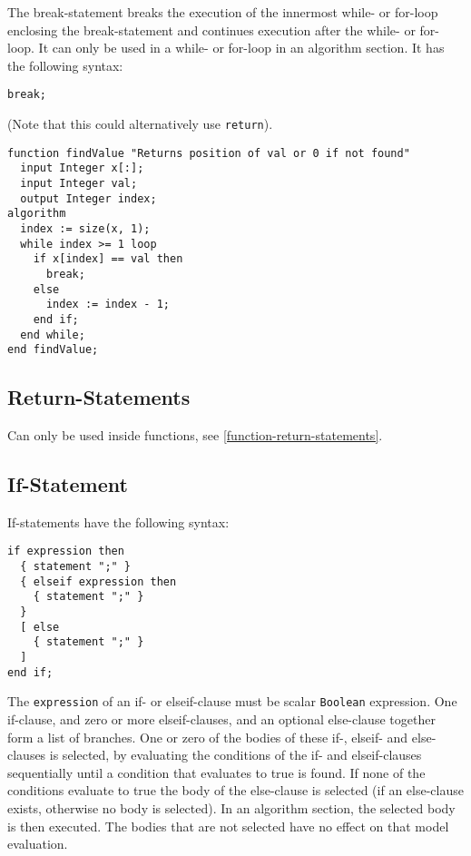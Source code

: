 The break-statement breaks the execution of the innermost while- or for-loop enclosing the break-statement and continues execution after the while- or for-loop.
It can only be used in a while- or for-loop in an algorithm section.
It has the following syntax:
\begin{lstlisting}[language=modelica]
break;
\end{lstlisting}

\begin{example}
(Note that this could alternatively use \lstinline!return!).
\begin{lstlisting}[language=modelica]
function findValue "Returns position of val or 0 if not found"
  input Integer x[:];
  input Integer val;
  output Integer index;
algorithm
  index := size(x, 1);
  while index >= 1 loop
    if x[index] == val then
      break;
    else
      index := index - 1;
    end if;
  end while;
end findValue;
\end{lstlisting}
\end{example}

\subsection{Return-Statements}\label{return-statements}

Can only be used inside functions, see \cref{function-return-statements}.

\subsection{If-Statement}\label{if-statement}

If-statements have the following syntax:
\begin{lstlisting}[language=grammar]
if expression then
  { statement ";" }
  { elseif expression then
    { statement ";" }
  }
  [ else
    { statement ";" }
  ]
end if;
\end{lstlisting}

The \lstinline!expression! of an if- or elseif-clause must be scalar \lstinline!Boolean! expression.  One if-clause, and zero or more elseif-clauses, and an optional else-clause together form a list of branches.  One or zero of the bodies of these if-, elseif- and else-clauses is selected, by evaluating the conditions of the if- and elseif-clauses sequentially until a condition that evaluates to true is found.  If none of the conditions evaluate to true the body of the else-clause is selected (if an else-clause exists, otherwise no body is selected).  In an algorithm section, the selected body is then executed.  The bodies that are not selected have no effect on that model evaluation.

